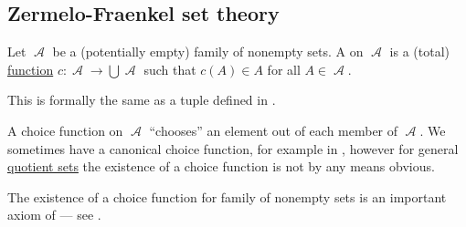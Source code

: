\subsection{Zermelo-Fraenkel set theory}\label{subsec:zermelo_fraenkel_set_theory}

\begin{definition}\label{def:choice_function}
  Let \( \mscrA \) be a (potentially empty) family of nonempty sets. A  on \( \mscrA \) is a (total) \hyperref[def:function]{function} \( c: \mscrA \to \bigcup \mscrA \) such that \( c(A) \in A \) for all \( A \in \mscrA \).

  This is formally the same as a tuple defined in .

  A choice function on \( \mscrA \) \enquote{chooses} an element out of each member of \( \mscrA \). We sometimes have a canonical choice function, for example in , however for general \hyperref[def:equivalence_relation/quotient]{quotient sets} the existence of a choice function is not by any means obvious.

  The existence of a choice function for family of nonempty sets is an important axiom of  --- see .
\end{definition}

